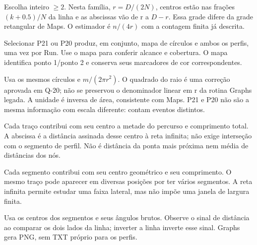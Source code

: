 Escolha  inteiro \(\geq2\). Nesta família, \(r=D/(2N)\), centros estão nas frações \((k+0.5)/N\) da linha e as abscissas vão de r a \(D-r\). Essa grade difere da grade retangular de Maps. O estimador é \(n/(4r)\) com a contagem finita já descrita.

Selecionar P21 ou P20 produz, em conjunto, mapa de círculos e ambos os perfis, uma vez por Run. Use o mapa para conferir alcance e cobertura. O mapa identifica ponto 1/ponto 2 e conserva seus marcadores de cor correspondentes.

Usa os mesmos círculos e \(m/(2\pi r^2)\). O quadrado do raio é uma correção aprovada em Q-20; não se preservou o denominador linear em r da rotina Graphs legada. A unidade é inversa de área, consistente com Maps. P21 e P20 não são a mesma informação com escala diferente: contam eventos distintos.

Cada traço contribui com seu centro a metade do percurso e comprimento total. A abscissa é a distância assinada desse centro à reta infinita; não exige interseção com o segmento de perfil. Não é distância da ponta mais próxima nem média de distâncias dos nós.

Cada segmento contribui com seu centro geométrico e seu comprimento. O mesmo traço pode aparecer em diversas posições por ter vários segmentos. A reta infinita permite estudar uma faixa lateral, mas não impõe uma janela de largura finita.

Usa os centros dos segmentos e seus ângulos brutos. Observe o sinal de distância ao comparar os dois lados da linha; inverter a linha inverte esse sinal. Graphs gera PNG, sem TXT próprio para os perfis.
